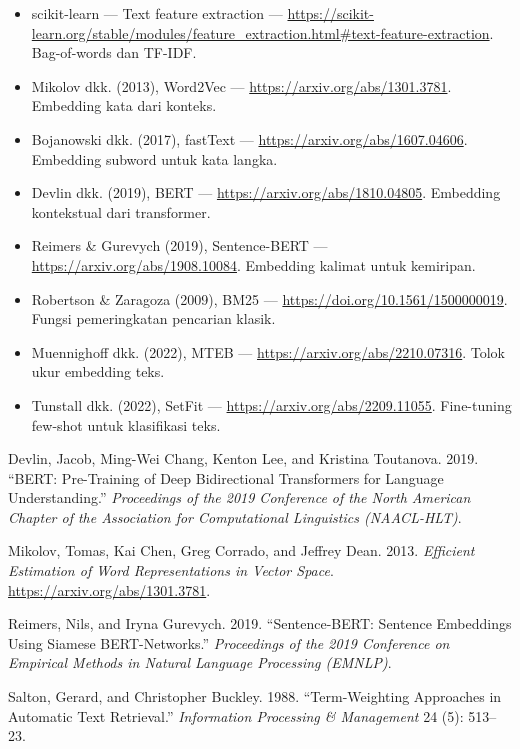 \begin{bacaan}

\begin{itemize}
\tightlist
\item
  scikit-learn --- Text feature extraction --- \url{https://scikit-learn.org/stable/modules/feature_extraction.html\#text-feature-extraction}. Bag-of-words dan TF-IDF.
\item
  Mikolov dkk. (2013), Word2Vec --- \url{https://arxiv.org/abs/1301.3781}. Embedding kata dari konteks.
\item
  Bojanowski dkk. (2017), fastText --- \url{https://arxiv.org/abs/1607.04606}. Embedding subword untuk kata langka.
\item
  Devlin dkk. (2019), BERT --- \url{https://arxiv.org/abs/1810.04805}. Embedding kontekstual dari transformer.
\item
  Reimers \& Gurevych (2019), Sentence-BERT --- \url{https://arxiv.org/abs/1908.10084}. Embedding kalimat untuk kemiripan.
\item
  Robertson \& Zaragoza (2009), BM25 --- \url{https://doi.org/10.1561/1500000019}. Fungsi pemeringkatan pencarian klasik.
\item
  Muennighoff dkk. (2022), MTEB --- \url{https://arxiv.org/abs/2210.07316}. Tolok ukur embedding teks.
\item
  Tunstall dkk. (2022), SetFit --- \url{https://arxiv.org/abs/2209.11055}. Fine-tuning few-shot untuk klasifikasi teks.
\end{itemize}

\end{bacaan}

\rujukanheading

\protect{}\label{refs}
\begin{CSLReferences}{1}{1}
Devlin, Jacob, Ming-Wei Chang, Kenton Lee, and Kristina Toutanova. 2019. {``{BERT}: Pre-Training of Deep Bidirectional Transformers for Language Understanding.''} \emph{Proceedings of the 2019 Conference of the North American Chapter of the Association for Computational Linguistics (NAACL-HLT)}.

Mikolov, Tomas, Kai Chen, Greg Corrado, and Jeffrey Dean. 2013. \emph{Efficient Estimation of Word Representations in Vector Space}. \url{https://arxiv.org/abs/1301.3781}.

Reimers, Nils, and Iryna Gurevych. 2019. {``Sentence-{BERT}: Sentence Embeddings Using Siamese {BERT}-Networks.''} \emph{Proceedings of the 2019 Conference on Empirical Methods in Natural Language Processing (EMNLP)}.

Salton, Gerard, and Christopher Buckley. 1988. {``Term-Weighting Approaches in Automatic Text Retrieval.''} \emph{Information Processing \& Management} 24 (5): 513--23.

\end{CSLReferences}
